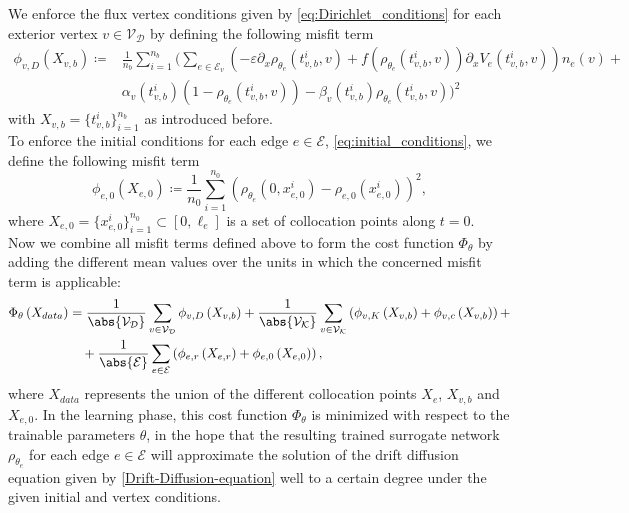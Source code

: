 We enforce the flux vertex conditions given by \cref{eq:Dirichlet_conditions} for each exterior vertex $v \in \mathcal{V}_\mathcal{D}$ by defining the following misfit term  
\begin{align} 
    \label{misfit:Dirichlet}
    \phi_{v,D}  \left( X_{v,b} \right) \coloneqq & \frac{1}{n_b} \sum_{i=1}^{n_b} \bigg( \sum_{e \in \mathcal{E}_v} \left(- \varepsilon \partial_x \rho_{\theta_e}  \left( t_{v,b}^i, v \right) + f\left(\rho_{\theta_e}  \left( t_{v,b}^i, v \right)\right) \partial_x V_e\left( t_{v,b}^i, v \right) \right) n_e  \left( v \right) + \\
    & \alpha_v \left( t_{v,b}^i \right)  \left( 1- \rho_{\theta_e}  \left( t_{v,b}^i, v \right) \right) - \beta_v \left( t_{v,b}^i \right) \rho_{\theta_e}  \left( t_{v,b}^i, v \right) \bigg)^2
\end{align}
with $X_{v,b} = \{t_{v,b}^i\}_{i=1}^{n_b}$ as introduced before. \\
To enforce the initial conditions for each edge $e \in \mathcal{E}$, \cref{eq:initial_conditions}, we define the following misfit term  
\begin{equation} 
    \label{misfit:initial}
    \phi_{e,0}  \left( X_{e,0} \right) \coloneqq \frac{1}{n_0} \sum_{i=1}^{n_0}  \left( \rho_{\theta_e}  \left( 0,x_{e,0}^i \right) - \rho_{e,0} \left( x_{e,0}^i \right) \right)^2, 
\end{equation} 
where $X_{e,0} = \{x_{e,0}^i\}_{i=1}^{n_0} \subset [0, \ell_e]$ is a set of collocation points along $t=0$. \\ 
Now we combine all misfit terms defined above to form the cost function $\Phi_\theta$ by adding the different mean values over the units in which the concerned misfit term is applicable: 
\begin{align} 
    \label{eq:loss:1}
    \Phi_{\theta} \left( X_{data} \right) & =  \frac{1}{\abs{\mathcal{V}_\mathcal{D}}} \sum_{v \in \mathcal{V}_\mathcal{D}} \phi_{v,D} \left( X_{v,b} \right) + \frac{1}{\abs{\mathcal{V}_\mathcal{K}}} \sum_{v \in \mathcal{V}_\mathcal{K}}  \left(  \phi_{v,K}  \left( X_{v,b} \right) + \phi_{v,c} \left( X_{v,b} \right)  \right) + \\
    & \quad + \frac{1}{\abs{\mathcal{E}}} \sum_{e \in \mathcal{E}}  \left(  \phi_{e,r}  \left( X_{e,r} \right) + \phi_{e,0}  \left( X_{e,0} \right)  \right), 
\end{align}
where $X_{data}$ represents the union of the different collocation points $X_e$, $X_{v,b}$ and $X_{e,0}$. In the learning phase, this cost function $\Phi_{\theta}$ is minimized with respect to the trainable parameters $\theta$, in the hope that the resulting trained surrogate network $\rho_{\theta_e}$ for each edge $e \in \mathcal{E}$ will approximate the solution of the drift diffusion equation given by \cref{Drift-Diffusion-equation} well to a certain degree under the given initial and vertex conditions. 

